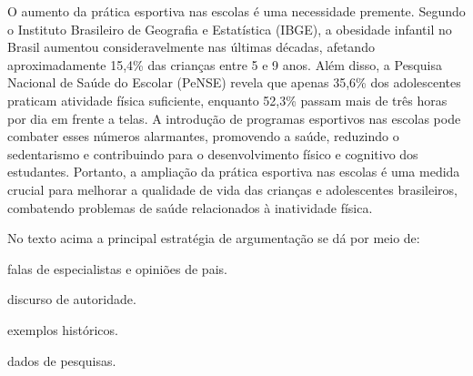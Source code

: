 \begin{myquote}





O aumento da prática esportiva nas escolas é uma necessidade premente.
Segundo o Instituto Brasileiro de Geografia e Estatística (IBGE), a obesidade
infantil no Brasil aumentou consideravelmente nas últimas décadas, afetando
aproximadamente 15,4\% das crianças entre 5 e 9 anos. Além disso, a Pesquisa
Nacional de Saúde do Escolar (PeNSE) revela que apenas 35,6\% dos adolescentes
praticam atividade física suficiente, enquanto 52,3\% passam mais de três
horas por dia em frente a telas. A introdução de programas esportivos nas
escolas pode combater esses números alarmantes, promovendo a saúde, reduzindo
o sedentarismo e contribuindo para o desenvolvimento físico e cognitivo dos
estudantes. Portanto, a ampliação da prática esportiva nas escolas é uma
medida crucial para melhorar a qualidade de vida das crianças e adolescentes
brasileiros, combatendo problemas de saúde relacionados à inatividade física.

\end{myquote}

No texto acima a principal estratégia de argumentação se dá por meio de:

\begin{escolha}

    \item falas de especialistas e opiniões de pais.

    \item discurso de autoridade.

    \item exemplos históricos.

    \item dados de pesquisas.

\end{escolha}

